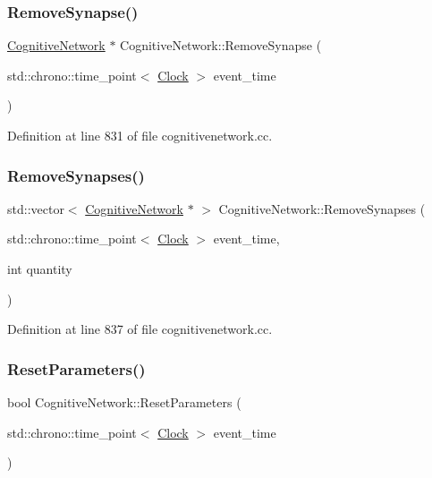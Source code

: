 \subsubsection{\texorpdfstring{Remove\+Synapse()}{RemoveSynapse()}}
{\footnotesize\ttfamily \mbox{\hyperlink{class_cognitive_network}{Cognitive\+Network}} $\ast$ Cognitive\+Network\+::\+Remove\+Synapse (\begin{DoxyParamCaption}\item[{std\+::chrono\+::time\+\_\+point$<$ \mbox{\hyperlink{universe_8h_a0ef8d951d1ca5ab3cfaf7ab4c7a6fd80}{Clock}} $>$}]{event\+\_\+time }\end{DoxyParamCaption})}



Definition at line 831 of file cognitivenetwork.\+cc.

\mbox{\label{class_cognitive_network_a87d6628f388baed1edb8efda9062c443}} 
\subsubsection{\texorpdfstring{Remove\+Synapses()}{RemoveSynapses()}}
{\footnotesize\ttfamily std\+::vector$<$ \mbox{\hyperlink{class_cognitive_network}{Cognitive\+Network}} $\ast$ $>$ Cognitive\+Network\+::\+Remove\+Synapses (\begin{DoxyParamCaption}\item[{std\+::chrono\+::time\+\_\+point$<$ \mbox{\hyperlink{universe_8h_a0ef8d951d1ca5ab3cfaf7ab4c7a6fd80}{Clock}} $>$}]{event\+\_\+time,  }\item[{int}]{quantity }\end{DoxyParamCaption})}



Definition at line 837 of file cognitivenetwork.\+cc.

\mbox{\label{class_cognitive_network_a8af8ed2605263e57a32e457aba2af99d}} 
\subsubsection{\texorpdfstring{Reset\+Parameters()}{ResetParameters()}}
{\footnotesize\ttfamily bool Cognitive\+Network\+::\+Reset\+Parameters (\begin{DoxyParamCaption}\item[{std\+::chrono\+::time\+\_\+point$<$ \mbox{\hyperlink{universe_8h_a0ef8d951d1ca5ab3cfaf7ab4c7a6fd80}{Clock}} $>$}]{event\+\_\+time }\end{DoxyParamCaption})}



